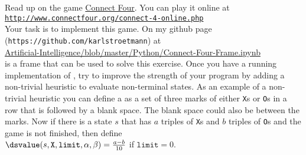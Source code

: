\exercise
Read up on the game \href{https://en.wikipedia.org/wiki/Connect_Four}{Connect Four}.  You can play it online at
\\[0.2cm]
\hspace*{1.3cm}
\href{http://www.connectfour.org/connect-4-online.php}{\texttt{http://www.connectfour.org/connect-4-online.php}}
\\[0.2cm]
Your task is to implement this game.  On my github page (\texttt{https://github.com/karlstroetmann}) at
\\[0.2cm]
\hspace*{1.3cm}
\href{https://github.com/karlstroetmann/Artificial-Intelligence/blob/master/Python/Connect-Four-Frame.ipynb}{Artificial-Intelligence/blob/master/Python/Connect-Four-Frame.ipynb} 
\\[0.2cm]
is a frame  that can be used to solve this exercise.  
Once you have a running implementation of , try to improve the strength of your program by
adding a non-trivial heuristic to evaluate non-terminal states.  As an example of a non-trivial heuristic you
can define a  as a set of three marks of either \texttt{X}s or \texttt{O}s in a row that is
followed by a blank space.  The blank space could also be between the marks.  Now if there is a state $s$ that
has $a$ triples of \texttt{X}s and $b$ triples of \texttt{O}s and the game is not finished, then define
\\[0.2cm]
\hspace*{1.3cm}
$\ds \texttt{value}(s, \texttt{X}, \texttt{limit}, \alpha, \beta) = \frac{a - b}{10}$ \quad if $\texttt{limit} = 0$.
\eox

